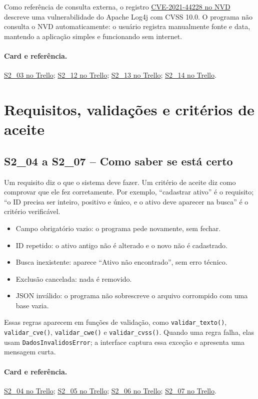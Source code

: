 \documentclass[11pt,a4paper]{article}
\newcommand{\referencia}[2]{\paragraph{Card e referência.}\href{#1}{#2}}
\newcommand{\cardsection}[1]{\Needspace{12\baselineskip}\subsection{#1}}
\begin{document}
Como referência de consulta externa, o registro \href{https://nvd.nist.gov/vuln/detail/CVE-2021-44228}{CVE-2021-44228 no NVD} descreve uma vulnerabilidade do Apache Log4j com CVSS 10.0. O programa não consulta o NVD automaticamente: o usuário registra manualmente fonte e data, mantendo a aplicação simples e funcionando sem internet.

\referencia{https://trello.com/c/NdgkJaYg}{S2\_03 no Trello}; \href{https://trello.com/c/zzyFLROU}{S2\_12 no Trello}; \href{https://trello.com/c/xMcbgbvn}{S2\_13 no Trello}; \href{https://trello.com/c/XFF3yzHz}{S2\_14 no Trello}.

\section{Requisitos, validações e critérios de aceite}

\cardsection{S2\_04 a S2\_07 -- Como saber se está certo}

Um requisito diz o que o sistema deve fazer. Um critério de aceite diz como comprovar que ele fez corretamente. Por exemplo, ``cadastrar ativo'' é o requisito; ``o ID precisa ser inteiro, positivo e único, e o ativo deve aparecer na busca'' é o critério verificável.

\begin{itemize}
  \item Campo obrigatório vazio: o programa pede novamente, sem fechar.
  \item ID repetido: o ativo antigo não é alterado e o novo não é cadastrado.
  \item Busca inexistente: aparece ``Ativo não encontrado'', sem erro técnico.
  \item Exclusão cancelada: nada é removido.
  \item JSON inválido: o programa não sobrescreve o arquivo corrompido com uma base vazia.
\end{itemize}

Essas regras aparecem em funções de validação, como \texttt{validar\_texto()}, \texttt{validar\_cve()}, \texttt{validar\_cwe()} e \texttt{validar\_cvss()}. Quando uma regra falha, elas usam \texttt{DadosInvalidosError}; a interface captura essa exceção e apresenta uma mensagem curta.

\referencia{https://trello.com/c/NcSDMJuv}{S2\_04 no Trello}; \href{https://trello.com/c/YSC57Mjy}{S2\_05 no Trello}; \href{https://trello.com/c/5beR1TIT}{S2\_06 no Trello}; \href{https://trello.com/c/Vs045ALu}{S2\_07 no Trello}.
\end{document}
